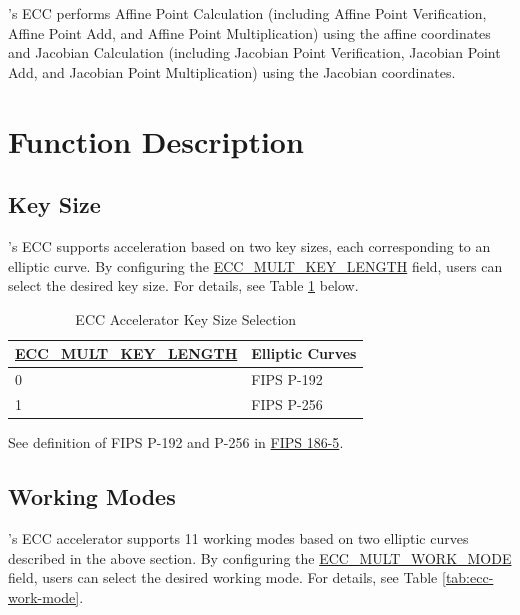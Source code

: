 \documentclass[main\_\_EN.tex]{subfiles}
\begin{document}
\chipname{}'s ECC performs Affine Point Calculation (including Affine Point Verification, Affine Point Add, and Affine Point Multiplication) using the affine coordinates and Jacobian Calculation (including Jacobian Point Verification, Jacobian Point Add, and Jacobian Point Multiplication) using the Jacobian coordinates.

\section{Function Description}
\label{sec:ecc-mode-config}
\subsection{Key Size}

\chipname{}'s ECC supports acceleration based on two key sizes, each corresponding to an elliptic curve. By configuring the \hyperref[fielddesc:ECCMULTKEYLENGTH]{ECC\_MULT\_KEY\_LENGTH} field, users can select the desired key size. For details, see Table \ref{tab:ecc-key-length} below.

\begin{table}[H]
    \centering
    \caption{ECC Accelerator Key Size Selection}
    \label{tab:ecc-key-length}
    \begin{threeparttable}
    \begin{tabular}{|p{4.2cm}|p{3.6cm}|}
    \hline
        \rowcolor{lightgray}
        \textbf{\hyperref[fielddesc:ECCMULTKEYLENGTH]{ECC\_MULT\_KEY\_LENGTH}} & \textbf{Elliptic Curves\tnote{*}} \\ \hline
        0 & FIPS P-192  \\\hline
        1 & FIPS P-256  \\\hline
    \end{tabular}
    \begin{tablenotes}
        \item[*] See definition of FIPS P-192 and P-256 in \href{https://nvlpubs.nist.gov/nistpubs/FIPS/NIST.FIPS.186-5.pdf}{FIPS 186-5}.
    \end{tablenotes}
    \end{threeparttable}
\end{table}

\subsection{Working Modes}
\label{sec:ecc-work-mode}

\chipname{}'s ECC accelerator supports 11 working modes based on two elliptic curves described in the above section. By configuring the \hyperref[fielddesc:ECCMULTWORKMODE]{ECC\_MULT\_WORK\_MODE} field, users can select the desired working mode. For details, see Table \ref{tab:ecc-work-mode}.
\end{document}
